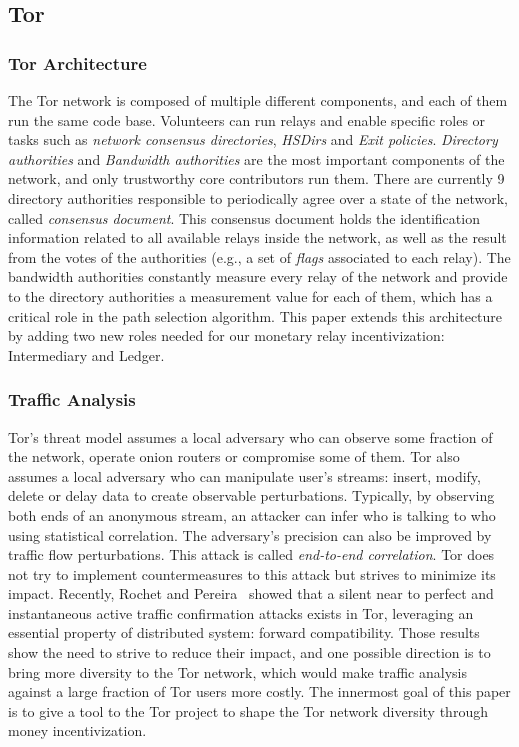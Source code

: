 \subsection{Tor}

\subsubsection{Tor Architecture}
The Tor network is composed of multiple different components, and each of them run the same code base. Volunteers can run relays and enable specific roles or tasks such as \textit{network consensus directories}, \textit{HSDirs} and \textit{Exit policies}. \textit{Directory authorities} and \textit{Bandwidth authorities} are the most important components of the network, and only trustworthy core contributors run them. There are currently 9 directory authorities responsible to periodically agree over a state of the network, called \textit{consensus document}. This consensus document holds the identification information related to all available relays inside the network, as well as the result from the votes of the authorities (e.g., a set of \textit{flags} associated to each relay). The bandwidth authorities constantly measure every relay of the network and provide to the directory authorities a measurement value for each of them, which has a critical role in the path selection algorithm. This paper extends this architecture by adding two new roles needed for our monetary relay incentivization: Intermediary and Ledger.
\subsubsection{Traffic Analysis}
Tor's threat model assumes a local adversary who can observe some fraction of the network, operate onion routers or compromise some of them. Tor also assumes a local adversary who can manipulate user's streams: insert, modify, delete or delay data to create observable perturbations. Typically, by observing both ends of an anonymous stream, an attacker can infer who is talking to who using statistical correlation. The adversary's precision can also be improved by traffic flow perturbations. This attack is called \textit{end-to-end correlation}. Tor does not try to implement countermeasures to this attack but strives to minimize its impact. Recently, Rochet and Pereira~\cite{popets-dropping} showed that a silent near to perfect and instantaneous active traffic confirmation attacks exists in Tor, leveraging an essential property of distributed system: forward compatibility. Those results show the need to strive to reduce their impact, and one possible direction is to bring more diversity to the Tor network, which would make traffic analysis against a large fraction of Tor users more costly. The innermost goal of this paper is to give a tool to the Tor project to shape the Tor network diversity through money incentivization.

